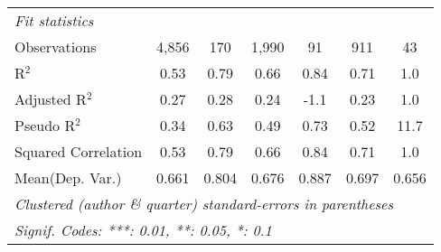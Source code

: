 \begin{tabular}{lcccccc}
   \midrule
   \emph{Fit statistics}\\
   Observations                                               & 4,856          & 170     & 1,990          & 91          & 911            & 43\\  
   R$^2$                                                      & 0.53           & 0.79    & 0.66           & 0.84        & 0.71           & 1.0\\  
   Adjusted R$^2$                                             & 0.27           & 0.28    & 0.24           & -1.1        & 0.23           & 1.0\\  
   Pseudo R$^2$                                               & 0.34           & 0.63    & 0.49           & 0.73        & 0.52           & 11.7\\  
   Squared Correlation                                        & 0.53           & 0.79    & 0.66           & 0.84        & 0.71           & 1.0\\  
Mean(Dep. Var.) & 0.661 & 0.804 & 0.676 & 0.887 & 0.697 & 0.656 \\
   \midrule \midrule
   \multicolumn{7}{l}{\emph{Clustered (author \& quarter) standard-errors in parentheses}}\\
   \multicolumn{7}{l}{\emph{Signif. Codes: ***: 0.01, **: 0.05, *: 0.1}}\\
\end{tabular}
\par\endgroup
